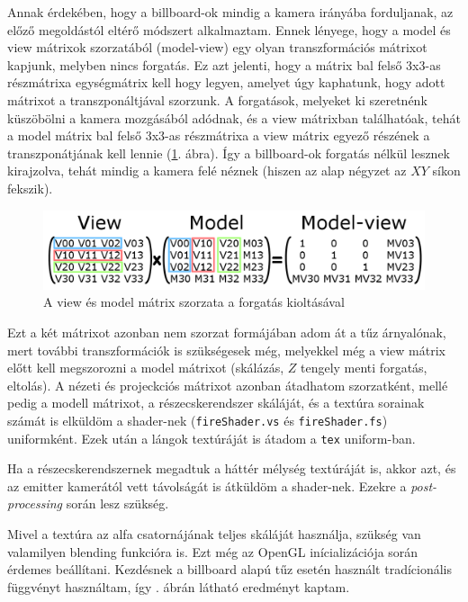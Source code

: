 Annak érdekében, hogy a billboard-ok mindig a kamera irányába forduljanak, az előző megoldástól eltérő módszert alkalmaztam. Ennek lényege, hogy a model és view mátrixok szorzatából (model-view) egy olyan transzformációs mátrixot kapjunk, melyben nincs forgatás. Ez azt jelenti, hogy a mátrix bal felső 3x3-as részmátrixa egységmátrix kell hogy legyen, amelyet úgy kaphatunk, hogy adott mátrixot a transzponáltjával szorzunk. A forgatások, melyeket ki szeretnénk küszöbölni a kamera mozgásából adódnak, és a view mátrixban találhatóak, tehát a model mátrix bal felső 3x3-as részmátrixa a view mátrix egyező részének a transzponátjának kell lennie (\ref{fig:matrixRotation}. ábra). Így a billboard-ok forgatás nélkül lesznek kirajzolva, tehát mindig a kamera felé néznek (hiszen az alap négyzet az $XY$ síkon fekszik).
\begin{figure}[h]
 \centering
 \includegraphics[width=\textwidth]{kepek/matrixRotation.png}
 \caption{A view és model mátrix szorzata a forgatás kioltásával}
 \label{fig:matrixRotation}
\end{figure}
Ezt a két mátrixot azonban nem szorzat formájában adom át a tűz árnyalónak, mert további transzformációk is szükségesek még, melyekkel még a view mátrix előtt kell megszorozni a model mátrixot (skálázás, $Z$ tengely menti forgatás, eltolás). A nézeti és projeckciós mátrixot azonban átadhatom szorzatként, mellé pedig a modell mátrixot, a részecskerendszer skáláját, és a textúra sorainak számát is elküldöm a shader-nek (\texttt{fireShader.vs} és \texttt{fireShader.fs}) uniformként. Ezek után a lángok textúráját is átadom a \texttt{tex} uniform-ban. 

Ha a részecskerendszernek megadtuk a háttér mélység textúráját is, akkor azt, és az emitter kamerától vett távolságát is átküldöm a shader-nek. Ezekre a \textit{post-processing} során lesz szükség.

Mivel a textúra az alfa csatornájának teljes skáláját használja, szükség van valamilyen blending funkcióra is. Ezt még az OpenGL inícializációja során érdemes beállítani. Kezdésnek a billboard alapú tűz esetén használt tradícionális függvényt használtam, így . ábrán látható eredményt kaptam.

